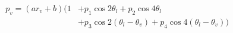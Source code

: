 \begin{align}
p_v=(ar_v+b)(1 &+ p_1\cos 2\theta_l + p_2\cos 4\theta_l \\
                &+ p_3\cos 2(\theta_l-\theta_v) + p_4\cos 4(\theta_l-\theta_v))
\end{align}
